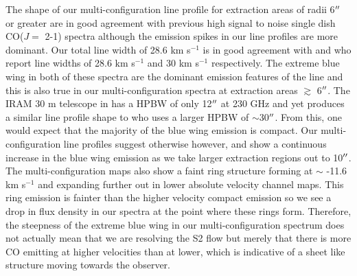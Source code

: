 \documentclass[iop]{emulateapj}
\begin{document}
The shape of our multi-configuration line profile for extraction areas of radii 6$\mbox{$^{\prime\prime}$}$ or greater are in good agreement with previous high signal to noise single dish CO($J=$ 2-1) spectra \cite[e.g.][Fig. 1.]{1994ApJ...424L.127H} although the emission spikes in our line profiles are more dominant. Our total line width of 28.6 km s${}^{-1}$ is in good agreement with \cite{1987ApJ...313..400H} and \cite{1994ApJ...424L.127H} who report line widths of 28.6 km s${}^{-1}$ and 30 km s${}^{-1}$ respectively. The extreme blue wing in both of these spectra are the dominant emission features of the line and this is also true in our multi-configuration spectra at extraction areas $\gtrsim$ 6$\mbox{$^{\prime\prime}$}$. The IRAM 30 m telescope in \cite{1994ApJ...424L.127H} has a HPBW of only 12$\mbox{$^{\prime\prime}$}$ at 230 GHz and yet produces a similar line profile shape to \cite{1987ApJ...313..400H} who uses a larger HPBW of $\sim$30$\mbox{$^{\prime\prime}$}$. From this, one would expect that the majority of the blue wing emission is compact. Our multi-configuration line profiles suggest otherwise however, and show a continuous increase in the blue wing emission as we take larger extraction regions out to 10$\mbox{$^{\prime\prime}$}$. The multi-configuration maps also show a faint ring structure forming at $\sim$ -11.6 km s${}^{-1}$ and expanding further out in lower absolute velocity channel maps. This ring emission is fainter than the higher velocity compact emission so we see a drop in flux density in our spectra at the point where these rings form. Therefore, the steepness of the extreme blue wing in our multi-configuration spectrum does not actually mean that we are resolving the S2 flow but merely that there is more CO emitting at higher velocities than at lower, which is indicative of a sheet like structure moving towards the observer.
\end{document}
